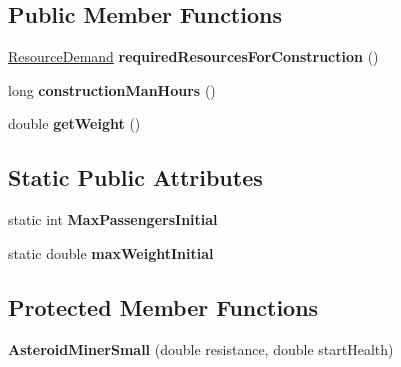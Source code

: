 \subsection*{Public Member Functions}
\begin{DoxyCompactItemize}
\item 
\hyperlink{classuniverse_1_1_resource_demand}{Resource\+Demand} {\bfseries required\+Resources\+For\+Construction} ()\hypertarget{classtools_1_1vehicles_1_1space_1_1_asteroid_miner_small_a7e9605b5f9b60fac8d3d6b81b226ae15}{}\label{classtools_1_1vehicles_1_1space_1_1_asteroid_miner_small_a7e9605b5f9b60fac8d3d6b81b226ae15}

\item 
long {\bfseries construction\+Man\+Hours} ()\hypertarget{classtools_1_1vehicles_1_1space_1_1_asteroid_miner_small_ae90a216f6733d9973b95e27dd12262e7}{}\label{classtools_1_1vehicles_1_1space_1_1_asteroid_miner_small_ae90a216f6733d9973b95e27dd12262e7}

\item 
double {\bfseries get\+Weight} ()\hypertarget{classtools_1_1vehicles_1_1space_1_1_asteroid_miner_small_a864a3870bc051aab28a4bbec90a8562d}{}\label{classtools_1_1vehicles_1_1space_1_1_asteroid_miner_small_a864a3870bc051aab28a4bbec90a8562d}

\end{DoxyCompactItemize}
\subsection*{Static Public Attributes}
\begin{DoxyCompactItemize}
\item 
static int {\bfseries Max\+Passengers\+Initial}\hypertarget{classtools_1_1vehicles_1_1space_1_1_asteroid_miner_small_a2cfde57cf96c7b678ef1374cedf46668}{}\label{classtools_1_1vehicles_1_1space_1_1_asteroid_miner_small_a2cfde57cf96c7b678ef1374cedf46668}

\item 
static double {\bfseries max\+Weight\+Initial}\hypertarget{classtools_1_1vehicles_1_1space_1_1_asteroid_miner_small_aa2dc2e8283e31545c5abd70ca395fb0d}{}\label{classtools_1_1vehicles_1_1space_1_1_asteroid_miner_small_aa2dc2e8283e31545c5abd70ca395fb0d}

\end{DoxyCompactItemize}
\subsection*{Protected Member Functions}
\begin{DoxyCompactItemize}
\item 
{\bfseries Asteroid\+Miner\+Small} (double resistance, double start\+Health)\hypertarget{classtools_1_1vehicles_1_1space_1_1_asteroid_miner_small_afa79cdb20cd2c26356044e95fdf482d9}{}\label{classtools_1_1vehicles_1_1space_1_1_asteroid_miner_small_afa79cdb20cd2c26356044e95fdf482d9}

\end{DoxyCompactItemize}
